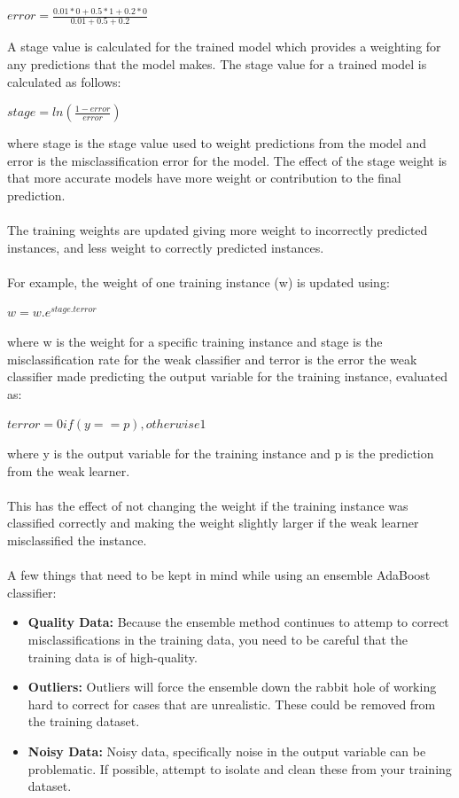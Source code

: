 \documentclass[12pt]{article}
\begin{document}
\begin{justify}
			\begin{center}
				$ error = \frac{0.01 * 0 + 0.5 * 1 + 0.2 * 0}{0.01 + 0.5 + 0.2} $
			\end{center}
			A stage value is calculated for the trained model  which provides a weighting for any predictions that the model makes. The stage value for a trained model is calculated as follows:
			\begin{center}
				$ stage = ln(\frac{1 - error}{error}) $
			\end{center}
			where stage is the stage value used to weight predictions from the model and error is the misclassification error for the model. The effect of the stage weight is that more accurate models have more weight or contribution to the final prediction.\\
			\\The training weights are updated giving more weight to incorrectly predicted instances, and less weight to correctly predicted instances.\\
			\\For example, the weight of one training instance (w) is updated using: 
			\begin{center}
				$ w = w.e^{stage.terror} $
			\end{center}
			where w is the weight for a specific training instance and stage is the misclassification rate for the weak classifier and terror is the error the weak classifier made predicting the output variable for the training instance, evaluated as: 
			\begin{center}
				$ terror = 0 if(y == p), otherwise 1 $
			\end{center}
			where y is the output variable for the training instance and p is the prediction from the weak learner.\\
			\\This has the effect of not changing the weight if the training instance was classified correctly and making the weight slightly larger if the weak learner misclassified the instance.\\
			\\A few things that need to be kept in mind while using an ensemble AdaBoost classifier:
			\begin{itemize}
				\item \textbf{Quality Data: } \textnormal{Because the ensemble method continues to attemp to correct misclassifications in the training data, you need to be careful that the training data is of high-quality.}
				\item \textbf{Outliers: } \textnormal{Outliers will force the ensemble down the rabbit hole of working hard to correct for cases that are unrealistic. These could be removed from the training dataset.}
				\item \textbf{Noisy Data: } \textnormal{Noisy data, specifically noise in the output variable can be problematic. If possible, attempt to isolate and clean these from your training dataset.}
			\end{itemize}
		\end{justify}
\end{document}
